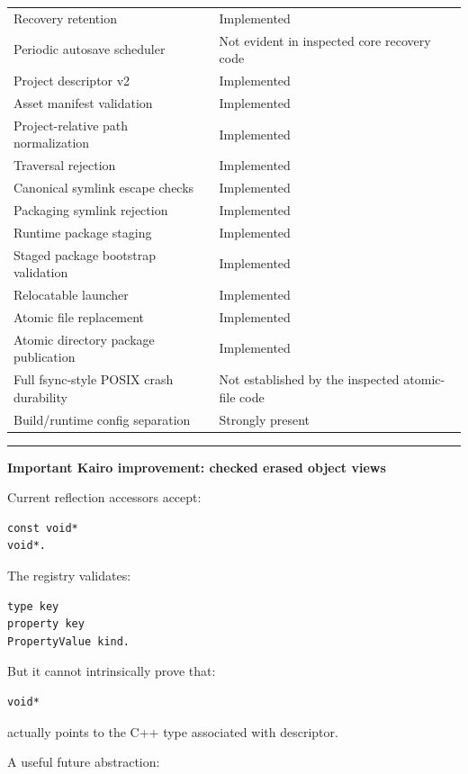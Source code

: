 {\begin{longtable}[]{@{}
  >{\raggedright\arraybackslash}p{}
  >{\raggedright\arraybackslash}p{}@{}}
Recovery retention & Implemented \\
Periodic autosave scheduler & Not evident in inspected core recovery code \\
Project descriptor v2 & Implemented \\
Asset manifest validation & Implemented \\
Project-relative path normalization & Implemented \\
Traversal rejection & Implemented \\
Canonical symlink escape checks & Implemented \\
Packaging symlink rejection & Implemented \\
Runtime package staging & Implemented \\
Staged package bootstrap validation & Implemented \\
Relocatable launcher & Implemented \\
Atomic file replacement & Implemented \\
Atomic directory package publication & Implemented \\
Full fsync-style POSIX crash durability & Not established by the inspected atomic-file code \\
Build/runtime config separation & Strongly present \\
\end{longtable}
}

\begin{center}\rule{0.5\linewidth}{0.5pt}\end{center}

\textbf{Important Kairo improvement: checked erased object views}

Current reflection accessors accept:

\begin{verbatim}
const void*
void*.
\end{verbatim}

The registry validates:

\begin{verbatim}
type key
property key
PropertyValue kind.
\end{verbatim}

But it cannot intrinsically prove that:

\begin{verbatim}
void*
\end{verbatim}

actually points to the C++ type associated with descriptor.

A useful future abstraction:

